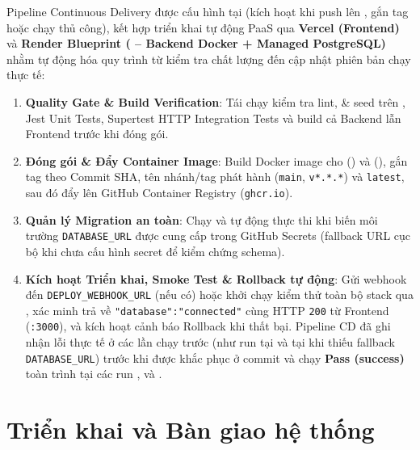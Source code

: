 \documentclass[12pt,a4paper]{report}
\begin{document}
Pipeline Continuous Delivery được cấu hình tại  (kích hoạt khi push lên , gắn tag  hoặc chạy thủ công), kết hợp triển khai tự động PaaS qua \textbf{Vercel (Frontend)} và \textbf{Render Blueprint ( -- Backend Docker + Managed PostgreSQL)} nhằm tự động hóa quy trình từ kiểm tra chất lượng đến cập nhật phiên bản chạy thực tế:
\begin{enumerate}[leftmargin=*]
\item \textbf{Quality Gate \& Build Verification}: Tái chạy kiểm tra lint,  \& seed trên , Jest Unit Tests, Supertest HTTP Integration Tests và build cả Backend lẫn Frontend trước khi đóng gói.
\item \textbf{Đóng gói \& Đẩy Container Image}: Build Docker image cho  () và  (), gắn tag theo Commit SHA, tên nhánh/tag phát hành (\texttt{main}, \texttt{v*.*.*}) và \texttt{latest}, sau đó đẩy lên GitHub Container Registry (\texttt{ghcr.io}).
\item \textbf{Quản lý Migration an toàn}: Chạy  và tự động thực thi  khi biến môi trường \texttt{DATABASE\_URL} được cung cấp trong GitHub Secrets (fallback URL cục bộ khi chưa cấu hình secret để kiểm chứng schema).
\item \textbf{Kích hoạt Triển khai, Smoke Test \& Rollback tự động}: Gửi webhook đến \texttt{DEPLOY\_WEBHOOK\_URL} (nếu có) hoặc khởi chạy kiểm thử toàn bộ stack qua , xác minh  trả về \texttt{"database":"connected"} cùng HTTP \texttt{200} từ Frontend (\texttt{:3000}), và kích hoạt cảnh báo Rollback khi thất bại. Pipeline CD đã ghi nhận lỗi thực tế ở các lần chạy trước (như run  tại  và  tại  khi thiếu fallback \texttt{DATABASE\_URL}) trước khi được khắc phục ở commit  và chạy \textbf{Pass (success)} toàn trình tại các run ,  và .
\end{enumerate}

\section{Triển khai và Bàn giao hệ thống}
\end{document}
